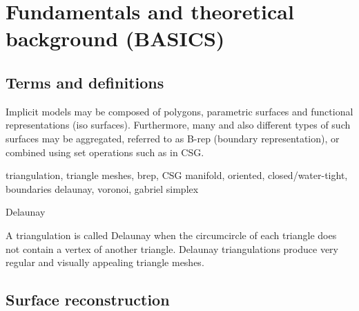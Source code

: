 \chapter{Fundamentals and theoretical background (BASICS)}
\label{ch:fundamentals}

\section{Terms and definitions}
\label{sec:definitions}

Implicit models may be composed of polygons, parametric surfaces and functional representations (iso surfaces).
Furthermore, many and also different types of such surfaces may be aggregated, referred to as B-rep (boundary representation), or combined using set operations such as in CSG.


triangulation,
triangle meshes,
brep, CSG
manifold, oriented, closed/water-tight, boundaries
delaunay, voronoi, gabriel simplex

Delaunay

A triangulation is called Delaunay when the circumcircle of each triangle does not contain a vertex of another triangle. Delaunay triangulations produce very regular and visually appealing triangle meshes.


\section{Surface reconstruction}
\label{sec:surface_reconstruction}

